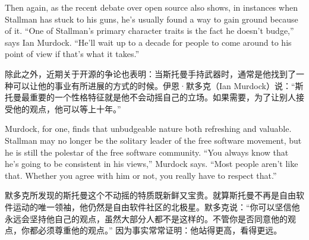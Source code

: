 

\ifdefined\eng
Then again, as the recent debate over open source also shows, in instances when Stallman has stuck to his guns, he's usually found a way to gain ground because of it. ``One of Stallman's primary character traits is the fact he doesn't budge,'' says Ian Murdock. ``He'll wait up to a decade for people to come around to his point of view if that's what it takes.''
\fi

\ifdefined\chs
除此之外，近期关于开源的争论也表明：当斯托曼手持武器时，通常是他找到了一种可以让他的事业有所进展的方式的时候。伊恩·默多克（Ian Murdock）说：``斯托曼最重要的一个性格特征就是他不会动摇自己的立场。如果需要，为了让别人接受他的观点，他可以等上十年。''
\fi

\ifdefined\eng
Murdock, for one, finds that unbudgeable nature both refreshing and valuable. Stallman may no longer be the solitary leader of the free software movement, but he is still the polestar of the free software community. ``You always know that he's going to be consistent in his views,'' Murdock says. ``Most people aren't like that. Whether you agree with him or not, you really have to respect that.''
\fi

\ifdefined\chs
默多克所发现的斯托曼这个不动摇的特质既新鲜又宝贵。就算斯托曼不再是自由软件运动的唯一领袖，他仍然是自由软件社区的北极星。默多克说：``你可以坚信他永远会坚持他自己的观点，虽然大部分人都不是这样的。不管你是否同意他的观点，你都必须尊重他的观点。'' 因为事实常常证明：他站得更高，看得更远。
\fi

\theendnotes
\setcounter{endnote}{0}
